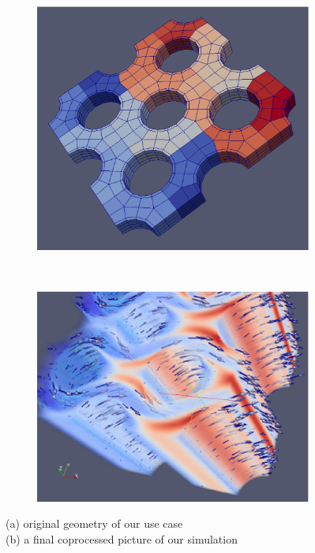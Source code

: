 \begin{figure}
  \centering
  \begin{subfigure}[b]{0.45\textwidth}
    \includegraphics[scale=0.195]{pictures/pieceofcake.eps}
    \label{fig:piece}
  \end{subfigure}
  ~
  \begin{subfigure}[b]{0.45\textwidth}
    \includegraphics[scale=0.41]{pictures/res.eps}
    \label{fig:res}
  \end{subfigure}
  \caption{(a) original geometry of our use case\\
  \hspace{8em}(b)  a final coprocessed picture of our simulation}
\end{figure}

